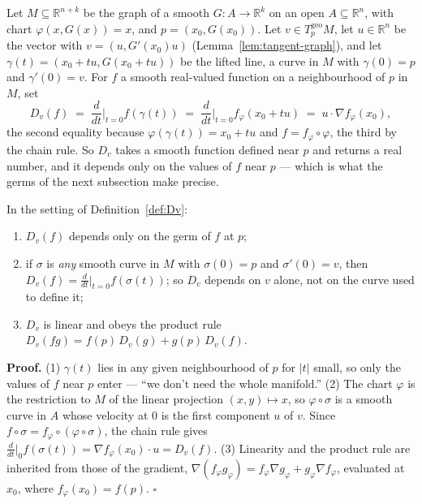 \documentclass[11pt]{report}
\makeatletter
\newcounter{defcounter}[section]
\newcounter{thmcounter}[section]
\renewenvironment{proof}[1][Proof]{\noindent\textbf{#1.} }{\hfill$\square$\par\vspace{5pt}}
\newcommand{\thmlabel}[1]{\edef\@currentlabel{\arabic{section}.\arabic{thmcounter}}\label{#1}}
\newcommand{\deflabel}[1]{\edef\@currentlabel{\arabic{section}.\arabic{defcounter}}\label{#1}}
\newcommand{\geo}{\mathrm{geo}}
\newcommand{\leeref}[1]{\par\smallskip{\raggedleft\footnotesize\textsc{Lee}:\ #1\par}}
\makeatother
\begin{document}
\begin{defbox}\deflabel{def:Dv}
Let $M \subseteq \mathbb{R}^{n+k}$ be the graph of a smooth $G : A \to \mathbb{R}^k$ on an open $A \subseteq \mathbb{R}^n$, with chart $\varphi(x, G(x)) = x$, and $p = (x_0, G(x_0))$. Let $v \in T^{\geo}_pM$, let $u \in \mathbb{R}^n$ be the vector with $v = (u, G'(x_0)u)$ (Lemma~\ref{lem:tangent-graph}), and let $\gamma(t) = (x_0 + tu, G(x_0 + tu))$ be the lifted line, a curve in $M$ with $\gamma(0) = p$ and $\gamma'(0) = v$. For $f$ a smooth real-valued function on a neighbourhood of $p$ in $M$, set
\[
D_v(f) \;=\; \frac{d}{dt}\Big|_{t=0} f(\gamma(t)) \;=\; \frac{d}{dt}\Big|_{t=0} f_\varphi(x_0 + tu) \;=\; u \cdot \nabla f_\varphi(x_0),
\]
the second equality because $\varphi(\gamma(t)) = x_0 + tu$ and $f = f_\varphi \circ \varphi$, the third by the chain rule. So $D_v$ takes a smooth function defined near $p$ and returns a real number, and it depends only on the values of $f$ near $p$ --- which is what the germs of the next subsection make precise.
\leeref{Proposition 3.2 (in $\mathbb{R}^n$)}
\end{defbox}

\begin{propbox}\thmlabel{prop:Dv-properties}
In the setting of Definition~\ref{def:Dv}:
\begin{enumerate}
    \item $D_v(f)$ depends only on the germ of $f$ at $p$;
    \item if $\sigma$ is \emph{any} smooth curve in $M$ with $\sigma(0) = p$ and $\sigma'(0) = v$, then $D_v(f) = \frac{d}{dt}\big|_{t=0} f(\sigma(t))$; so $D_v$ depends on $v$ alone, not on the curve used to define it;
    \item $D_v$ is linear and obeys the product rule $D_v(fg) = f(p)\,D_v(g) + g(p)\,D_v(f)$.
\end{enumerate}
\end{propbox}

\begin{proof}
(1) $\gamma(t)$ lies in any given neighbourhood of $p$ for $|t|$ small, so only the values of $f$ near $p$ enter --- ``we don't need the whole manifold.'' (2) The chart $\varphi$ is the restriction to $M$ of the linear projection $(x,y) \mapsto x$, so $\varphi \circ \sigma$ is a smooth curve in $A$ whose velocity at $0$ is the first component $u$ of $v$. Since $f \circ \sigma = f_\varphi \circ (\varphi \circ \sigma)$, the chain rule gives $\frac{d}{dt}\big|_0 f(\sigma(t)) = \nabla f_\varphi(x_0) \cdot u = D_v(f)$. (3) Linearity and the product rule are inherited from those of the gradient, $\nabla(f_\varphi g_\varphi) = f_\varphi \nabla g_\varphi + g_\varphi \nabla f_\varphi$, evaluated at $x_0$, where $f_\varphi(x_0) = f(p)$.
\end{proof}
\end{document}
